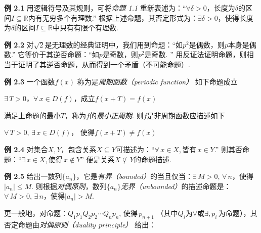 \documentclass{article}
\begin{document}
\vspace{4pt}

\textbf{例 2.1} 用逻辑符号及其规则，可将\textit{命题 1.1} 重新表述为：“$\forall\delta>0$，长度为$
\delta$的区间$I\subseteq \mathbb{R}$内有无穷多个有理数.” 根据上述命题，其否定形式为：$\exists\delta>0$，使得长度为$\delta$的区间$I\subseteq \mathbb{R}$中只有有限个有理数.

\vspace{3pt}

\textbf{例 2.2} 对$\sqrt{2}$是无理数的经典证明中，我们用到命题：“如$p^{2}$是偶数，则$p$本身是偶数.” 它等价于其逆否命题：“如$p$是奇数，则$p^{2}$是奇数. ” 用反证法证明命题，则相当于证明了其逆否命题，从而得到一个矛盾（不可能命题）.

\vspace{3pt}

\textbf{例 2.3} 一个函数$f(x)$ 称为是\textit{周期函数（periodic function）} 如下命题成立

\vspace{3pt}

\qquad $\exists\, T>0$，$\forall\,x\in D(f)$，成立$f(x+T)=f(x)$

\vspace{3pt}

满足上命题的最小$T$，称为$f$的\textit{最小正周期}. 则$f$是非周期函数应描述如下

\vspace{3pt}

\qquad $\forall\,T>0,\,\exists\,x\in D(f)$，
使得$f(x+T)\neq f(x)$

\vspace{3pt}

\textbf{例 2.4} 对集合$X,Y$，包含关系$X\subseteq Y$可描述为：“$\forall\,x\in X$,\,皆有\,$x\in Y$.” 则其否命题：“$\exists\,x\in X$,\,使得\,$x\notin Y$” 便是关系$X\nsubseteq Y$的命题描述.

\vspace{3pt}

\textbf{例 2.5} 给出一数列$\{a_{n}\}$，它是\textit{有界（bounded）}的当且仅当：$\exists\,M>0,\,\forall\,n$，使得$|a_{n}|\leq M$. 则根据\textit{对偶原则}，数列$\{a_{n}\}$\textit{无界（unbounded）}的描述命题是：$\forall\,M>0,\,\exists\,n$，使得$|a_{n}|>M$.

\vspace{4pt}

更一般地，对命题：$Q_{1}p_{1}Q_{2}p_{2}\cdots Q_{n}p_{n},\,\textit{使得}\,p_{n+1}$ （其中$Q_{i}$为$\forall$或$\exists$,\,$p_{i}$\,为命题），其否定命题由\textit{对偶原则（duality principle）} 给出：
\end{document}
